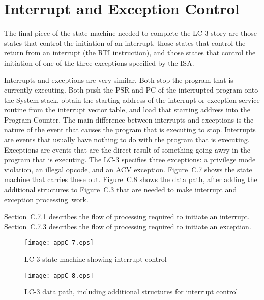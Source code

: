 \documentclass{patt}
\begin{document}
\FloatBarrier
\section{Interrupt and Exception Control}

The final piece of the state machine needed to complete the LC-3 story
are those states that control the initiation of an interrupt, those
states that control the return from an interrupt (the RTI\vadjust{\pagebreak}
instruction), and those states that control the initiation of one of
the three exceptions specified by the ISA.  

Interrupts and exceptions are very similar.  Both stop the program that is 
currently executing.  Both push the PSR and PC of the interrupted program 
onto the System stack, obtain the starting address of the interrupt or 
exception service routine from the interrupt vector table, and load that 
starting address into the Program Counter.  The main difference between 
interrupts and exceptions is the nature of the event that causes the program 
that is executing to stop.  Interrupts are events that usually have nothing to 
do with the program that is executing.  Exceptions are events that are the 
direct result of something going awry in the program that is executing.
The LC-3 specifies three exceptions: a privilege mode violation, an illegal 
opcode, and an ACV exception.  Figure~C.7 shows the state machine that carries 
these out.  Figure~C.8 shows the data path, after adding the additional 
structures to Figure~C.3 that are needed to make interrupt and exception 
processing~work.

Section~C.7.1 describes the flow of processing required to initiate an 
interrupt.  Section~C.7.3 describes the flow of processing required to
initiate an exception.

\begin{figure}
\begin{minipage}{36pc}
\centerline{\texttt{[image: appC\_7.eps]}}
\caption{LC-3 state machine showing interrupt control}
\label{fig:insts}
\label{fig:statemachineint}
\end{minipage}
\end{figure}


\begin{figure}
\hspace*{-8pc}\begin{minipage}{36pc}
\centerline{\texttt{[image: appC\_8.eps]}} \caption{LC-3 data path,
including additional structures for interrupt
  control}
\label{fig:datapathint}
\end{minipage}
\vspace{2pc}
\end{figure}
\end{document}
